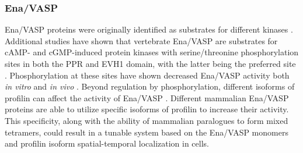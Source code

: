 \subsubsection{Ena/VASP}
Ena/VASP proteins were originally identified as substrates for different kinases \citep{halbrugge_analysis_1990,gertler_genetic_1990}. Additional studies have shown that vertebrate Ena/VASP are substrates for cAMP- and cGMP-induced protein kinases with serine/threonine phosphorylation sites in both the PPR and EVH1 domain, with the latter being the preferred site \citep{gertler_mena_1996,lambrechts_camp-dependent_2000,harbeck_phosphorylation_2000,butt_camp-_1994}. Phosphorylation at these sites have shown decreased Ena/VASP activity both \textit{in vitro} and \textit{in vivo} \citep{loureiro_critical_2002,howe_regulation_2002,benz_differential_2009,butt_camp-_1994}. 
Beyond regulation by phosphorylation, different isoforms of profilin can affect the activity of Ena/VASP \citep{hansen_vasp_2010,mouneimne_differential_2012}. Different mammalian Ena/VASP proteins are able to utilize specific isoforms of profilin to increase their activity. This specificity, along with the ability of mammalian paralogues to form mixed tetramers, could result in a tunable system based on the Ena/VASP monomers and profilin isoform spatial-temporal localization in cells. 

